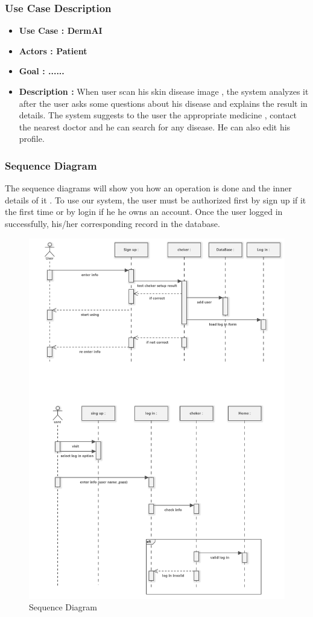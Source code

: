 \subsubsection{Use Case Description }
\begin{itemize}
    \item \textbf{Use Case    :  DermAI}
    \item \textbf{Actors      :  Patient}
    \item \textbf{Goal        :  ......} 
    \item \textbf{Description :} When user scan his skin disease image , the 
    system analyzes it after 
    the user asks some questions about his disease and explains the result in 
    details. The system 
    suggests to the user the appropriate medicine , contact the nearest doctor 
    and he can search for any disease. He can also edit his profile.\\
\end{itemize}
\subsubsection{Sequence Diagram}
The sequence diagrams will show you how an operation is done and the inner 
details of it . To use our system, the user must be authorized first by sign up 
if it the first time or by login if he he owns an account. Once the user logged 
in successfully, his/her corresponding record in the database.
\begin{figure}
    \centering
    \includegraphics[width = 12cm]{backmatter/figures/sequence.png}
    \caption{Sequence Diagram}
\end{figure}
\newpage
